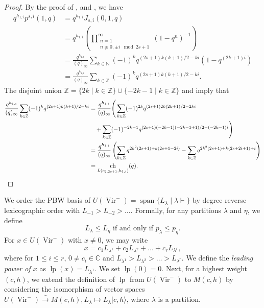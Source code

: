 \documentclass[a4paper, 12pt, reqno]{amsart}
\theoremstyle{remark}
\DeclareMathOperator{\Vir}{Vir}
\DeclareMathOperator{\ch}{ch}
\DeclareMathOperator{\vspan}{span}
\DeclareMathOperator{\lp}{lp}
\begin{document}
\begin{proof}
  By the proof of , \cite[Lemma 7.3]{andrews_theory_1998} and \cite[Corollary 2.9]{andrews_theory_1998}, we have
  \begin{align*}
    q^{h_{1, i}}p^{s, i}(1, q) &= q^{h_{1, i}}J_{s, i}(0, 1, q) \\
                               &= q^{h_{1, i}}\left(\prod^{\infty}_{\substack{n = 1 \\ n \not\equiv 0, \pm i \mod 2s + 1}}(1 - q^n)^{-1}\right) \\
                               &= \frac{q^{h_{1, i}}}{(q)_{\infty}}\sum_{k \in \mathbb{N}}(-1)^kq^{(2s + 1)k(k + 1)/2 - ki}(1 - q^{(2k + 1)i}) \\
                               &= \frac{q^{h_{1, i}}}{(q)_{\infty}}\sum_{k \in \mathbb{Z}}(-1)^kq^{(2s + 1)k(k + 1)/2 - ki}.
  \end{align*}
  The disjoint union $\mathbb{Z} = \{2k \mid k \in \mathbb{Z}\} \cup \{-2k - 1 \mid k \in \mathbb{Z}\}$ and  imply that
  \begin{align*}
    \frac{q^{h_{1, i}}}{(q)_{\infty}}\sum_{k \in \mathbb{Z}}(-1)^kq^{(2s + 1)k(k + 1)/2 - ki} &= \frac{q^{h_{1, i}}}{(q)_{\infty}}\Bigg(\sum_{k \in \mathbb{Z}}(-1)^{2k}q^{(2s + 1)2k(2k + 1)/2 - 2ki} \\
                                                                                              &\quad + \sum_{k \in \mathbb{Z}}(-1)^{-2k - 1}q^{(2s + 1)(-2k - 1)(-2k - 1 + 1)/2 - (-2k - 1)i}\Bigg) \\
                                                                                              &= \frac{q^{h_{1, i}}}{(q)_{\infty}}\left(\sum_{k \in \mathbb{Z}}q^{2k^2(2s + 1) + k(2s + 1 - 2i)} - \sum_{k \in \mathbb{Z}}q^{2k^2(2s + 1) + k(2s + 2i + 1) + i}\right) \\
                                                                                              &= \ch_{L(c_{2, 2s + 1}, h_{1, i})}(q). \qedhere
  \end{align*}
\end{proof}

We order the PBW basis of $U(\Vir^-) = \vspan\{L_{\lambda} \mid \lambda \vdash\}$ by degree reverse lexicographic order with $L_{-1} > L_{-2} > \dots$.
Formally, for any partitions $\lambda$ and $\eta$, we define
\begin{equation*}
  L_{\lambda} \le L_{\eta}\text{ if and only if }p_{\lambda} \le p_{\eta}.
\end{equation*}
For $x \in U(\Vir^-)$ with $x \neq 0$, we may write
\begin{equation*}
  x = c_1L_{\lambda^1} + c_2L_{\lambda^2} + \dots + c_rL_{\lambda^r},
\end{equation*}
where for $1 \le i \le r$, $0 \neq c_i \in \mathbb{C}$ and $L_{\lambda^1} > L_{\lambda^2} > \dots > L_{\lambda^r}$.
We define the \emph{leading power of $x$} as $\lp(x) = L_{\lambda^1}$.
We set $\lp(0) = 0$.
Next, for a highest weight $(c, h)$, we extend the definition of $\lp$ from $U(\Vir^-)$ to $M(c, h)$ by considering the isomorphism of vector spaces $U(\Vir^-) \xrightarrow{\sim} M(c, h), L_{\lambda} \mapsto L_{\lambda}|c, h\rangle$, where $\lambda$ is a partition.
\end{document}
